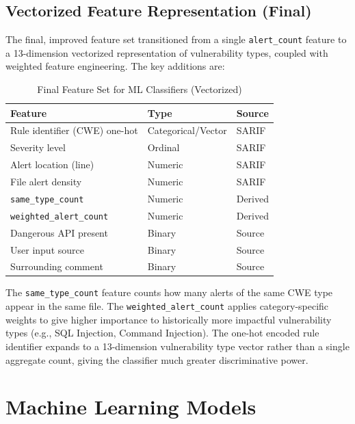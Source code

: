 \subsection{Vectorized Feature Representation (Final)}

The final, improved feature set transitioned from a single \texttt{alert\_count} feature
to a 13-dimension vectorized representation of vulnerability types, coupled with weighted
feature engineering. The key additions are:

\begin{table}[htbp]
  \centering
  \caption{Final Feature Set for ML Classifiers (Vectorized)}
  \label{tab:features}
  \renewcommand{\arraystretch}{1.2}
  \begin{tabular}{p{5cm}ll}
    \toprule
    \textbf{Feature} & \textbf{Type} & \textbf{Source} \\
    \midrule
    Rule identifier (CWE) one-hot & Categorical/Vector & SARIF \\
    Severity level & Ordinal & SARIF \\
    Alert location (line) & Numeric & SARIF \\
    File alert density & Numeric & SARIF \\
    \texttt{same\_type\_count} & Numeric & Derived \\
    \texttt{weighted\_alert\_count} & Numeric & Derived \\
    Dangerous API present & Binary & Source \\
    User input source & Binary & Source \\
    Surrounding comment & Binary & Source \\
    \bottomrule
  \end{tabular}
\end{table}

The \texttt{same\_type\_count} feature counts how many alerts of the same CWE type appear
in the same file. The \texttt{weighted\_alert\_count} applies category-specific weights
to give higher importance to historically more impactful vulnerability types (e.g., SQL
Injection, Command Injection). The one-hot encoded rule identifier expands to a
13-dimension vulnerability type vector rather than a single aggregate count, giving the
classifier much greater discriminative power.

\section{Machine Learning Models}

